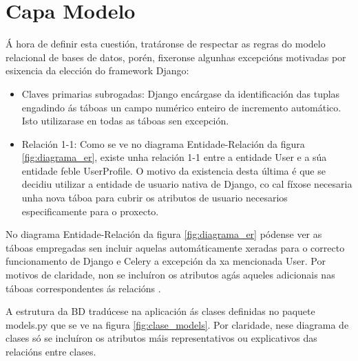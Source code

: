 \section{Capa Modelo}

Á hora de definir esta cuestión, tratáronse de respectar as regras do modelo relacional de bases de datos, porén, fixeronse algunhas excepcións motivadas por esixencia da elección do framework Django:

\begin{itemize}
	\item Claves primarias subrogadas: Django encárgase da identificación das tuplas engadindo ás táboas un campo numérico enteiro de incremento automático. Isto utilizarase en todas as táboas sen excepción.
	
	\item Relación 1-1: Como se ve no diagrama Entidade-Relación da figura \ref{fig:diagrama_er}, existe unha relación 1-1 entre a entidade User e a súa entidade feble UserProfile. O motivo da existencia desta última é que se decidiu utilizar a entidade de usuario nativa de Django, co cal fíxose necesaria unha nova táboa para cubrir os atributos de usuario necesarios especificamente para o proxecto. 
\end{itemize}

No diagrama Entidade-Relación da figura \ref{fig:diagrama_er} pódense ver as táboas empregadas sen incluir aquelas automáticamente xeradas para o correcto funcionamento de Django e Celery a excepción da xa mencionada User. Por motivos de claridade, non se incluíron os atributos agás aqueles adicionais nas táboas correspondentes ás relacións .

A estrutura da BD tradúcese na aplicación ás clases definidas no paquete models.py que se ve na figura \ref{fig:clase_models}. Por claridade, nese diagrama de clases só se incluíron os atributos máis representativos ou explicativos das relacións entre clases.

